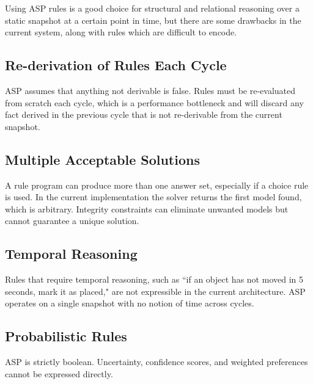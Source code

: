 \documentclass{article}
\begin{document}
Using ASP rules is a good choice for structural and relational reasoning
over a static snapshot at a certain point in time, but there are some
drawbacks in the current system, along with rules which are difficult to
encode.

\subsection{Re-derivation of Rules Each Cycle}

ASP assumes that anything not derivable is false. Rules must be re-evaluated
from scratch each cycle, which is a performance bottleneck and will discard
any fact derived in the previous cycle that is not re-derivable from the
current snapshot.

\subsection{Multiple Acceptable Solutions}

A rule program can produce more than one answer set, especially if a choice rule is used.
In the current implementation the solver returns the first model found, which is arbitrary.
Integrity constraints can eliminate unwanted models but cannot guarantee a unique solution.

\subsection{Temporal Reasoning}

Rules that require temporal reasoning, such as ``if an object has not moved
in 5 seconds, mark it as placed," are not expressible in the current
architecture. ASP operates on a single snapshot with no notion of time across cycles.

\subsection{Probabilistic Rules}

ASP is strictly boolean. Uncertainty, confidence scores, and weighted
preferences cannot be expressed directly.
\end{document}
